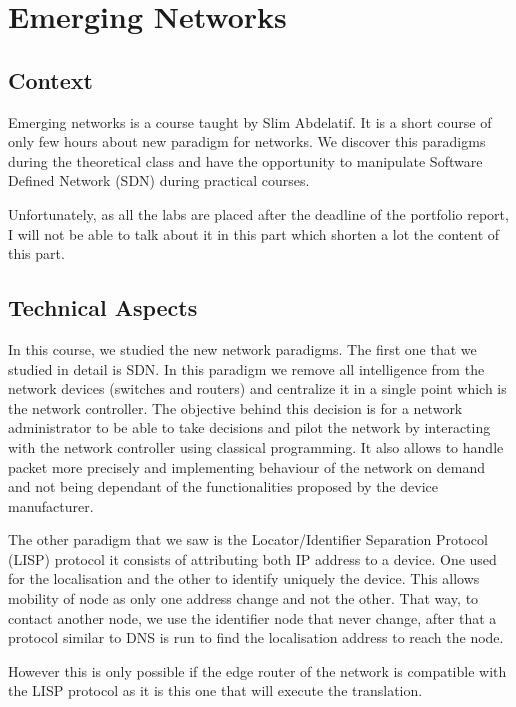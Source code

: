 \section{Emerging Networks}

\subsection{Context}

Emerging networks is a course taught by Slim Abdelatif. It is a short course of only few hours about new paradigm for networks. We discover this paradigms during the theoretical class and have the opportunity to manipulate Software Defined Network (SDN) during practical courses. 
\\\par

Unfortunately, as all the labs are placed after the deadline of the portfolio report, I will not be able to talk about it in this part which shorten a lot the content of this part.

\subsection{Technical Aspects}

In this course, we studied the new network paradigms. The first one that we studied in detail is SDN. In this paradigm we remove all intelligence from the network devices (switches and routers) and centralize it in a single point which is the network controller. The objective behind this decision is for a network administrator to be able to take decisions and pilot the network by interacting with the network controller using classical programming. It also allows to handle packet more precisely and implementing behaviour of the network on demand and not being dependant of the functionalities proposed by the device manufacturer.
\\\par

The other paradigm that we saw is the  Locator/Identifier Separation Protocol (LISP) protocol it consists of attributing both IP address to a device. One used for the localisation and the other to identify uniquely the device. This allows mobility of node as only one address change and not the other. That way, to contact another node, we use the identifier node that never change, after that a protocol similar to DNS is run to find the localisation address to reach the node. 
\par
However this is only possible if the edge router of the network is compatible with the LISP protocol as it is this one that will execute the translation.

